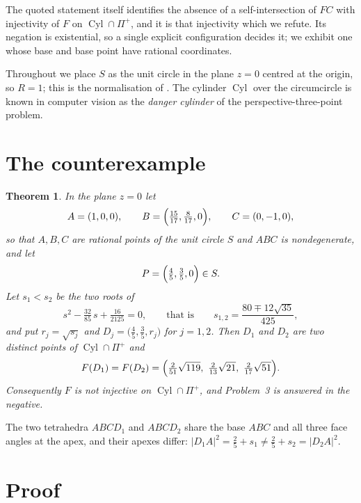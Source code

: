 \documentclass[11pt]{amsart}
\newtheorem{theorem}{Theorem}
\theoremstyle{remark}
\DeclareMathOperator{\Cyl}{Cyl}
\begin{document}
\noindent The quoted statement itself identifies the absence of a self-intersection of $FC$
with injectivity of $F$ on $\Cyl\cap\Pi^{+}$, and it is that injectivity which we refute.
Its negation is existential, so a single explicit configuration decides it; we exhibit one
whose base and base point have rational coordinates.

Throughout we place $S$ as the unit circle in the plane $z=0$ centred at the origin, so
$R=1$; this is the normalisation of \cite{NN}. The cylinder $\Cyl$ over the circumcircle is
known in computer vision as the \emph{danger cylinder} of the perspective-three-point
problem.

\section{The counterexample}

\begin{theorem}\label{thm:main}
In the plane $z=0$ let
\[
 A=(1,0,0),\qquad B=\Bigl(\tfrac{15}{17},\tfrac{8}{17},0\Bigr),\qquad C=(0,-1,0),
\]
so that $A,B,C$ are rational points of the unit circle $S$ and $ABC$ is nondegenerate, and
let
\[
 P=\Bigl(\tfrac45,\tfrac35,0\Bigr)\in S .
\]
Let $s_1<s_2$ be the two roots of
\begin{equation}\label{eq:quad}
 s^{2}-\tfrac{32}{85}\,s+\tfrac{16}{2125}=0,
 \qquad\text{that is}\qquad
 s_{1,2}=\frac{80\mp12\sqrt{35}}{425},
\end{equation}
and put $r_j=\sqrt{s_j}$ and $D_j=\bigl(\tfrac45,\tfrac35,r_j\bigr)$ for $j=1,2$. Then
$D_1$ and $D_2$ are two distinct points of $\Cyl\cap\Pi^{+}$ and
\begin{equation}\label{eq:image}
 F(D_1)=F(D_2)
 =\Bigl(\tfrac{2}{51}\sqrt{119},\ \tfrac{2}{13}\sqrt{21},\ \tfrac{2}{17}\sqrt{51}\Bigr).
\end{equation}
Consequently $F$ is not injective on $\Cyl\cap\Pi^{+}$, and Problem~3 is answered in the
negative.
\end{theorem}

The two tetrahedra $ABCD_1$ and $ABCD_2$ share the base $ABC$ and all three face angles at
the apex, and their apexes differ: $|D_1A|^{2}=\tfrac25+s_1\neq\tfrac25+s_2=|D_2A|^{2}$.

\section{Proof}
\end{document}
